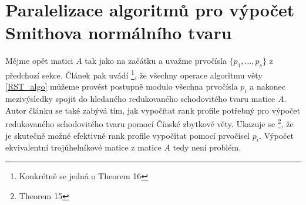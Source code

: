\section{Paralelizace algoritmů pro výpočet Smithova normálního tvaru}
Mějme opět matici $ A $ tak jako na začátku a uvažme prvočísla
$ \{ p_1, \dots, p_s \} $ z předchozí sekce. Článek \cite{triang} pak uvádí
\footnote{Konkrétně se jedná o Theorem 16},
že všechny operace algoritmu věty \ref{RST_algo} můžeme provést postupně
modulo všechna prvočísla $ p_i $ a nakonec mezivýsledky spojit do hledaného
redukovaného schodovitého tvaru matice $ A $. Autor článku \cite{triang} se
také zabývá tím, jak vypočítat rank profile potřebný pro výpočet redukovaného
schodovitého tvaru pomocí Čínské zbytkové věty. Ukazuje se
\footnote{Theorem 15},
že je skutečně možné efektivně rank profile vypočítat pomocí prvočísel $ p_i $.
Výpočet ekvivalentní trojúhelníkové matice z matice $ A $ tedy není problém.